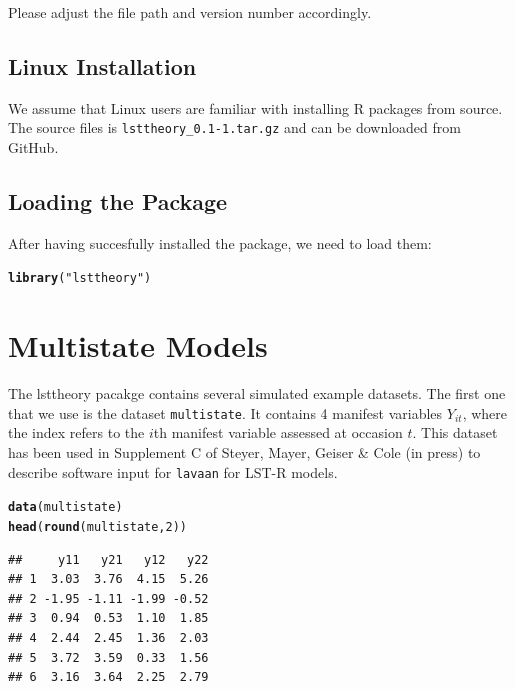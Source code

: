 \documentclass[10pt]{article}\usepackage{graphicx, color}
\makeatletter
\newcommand{\hlfunctioncall}[1]{\textcolor[rgb]{0.501960784313725,0,0.329411764705882}{\textbf{#1}}}%
\newcommand{\hlstring}[1]{\textcolor[rgb]{0.6,0.6,1}{#1}}%
\newenvironment{kframe}{%
 \def\at@end@of@kframe{}%
 \ifinner\ifhmode%
  \def\at@end@of@kframe{\end{minipage}}%
  \begin{minipage}{\columnwidth}%
 \fi\fi%
 \def\FrameCommand##1{\hskip\@totalleftmargin \hskip-\fboxsep
 \colorbox{shadecolor}{##1}\hskip-\fboxsep
     \hskip-\linewidth \hskip-\@totalleftmargin \hskip\columnwidth}%
 \MakeFramed {\advance\hsize-\width
   \@totalleftmargin\z@ \linewidth\hsize
   \@setminipage}}%
 {\par\unskip\endMakeFramed%
 \at@end@of@kframe}
\newenvironment{knitrout}{}{} %
\makeatother
\begin{document}
%
Please adjust the file path and version number accordingly. 

\subsection{Linux Installation}

We assume that Linux users are familiar with installing \textsf{R} packages from source. The source files is \texttt{lsttheory\_0.1-1.tar.gz} and can be downloaded from GitHub. 

\subsection{Loading the Package}

After having succesfully installed the package, we need to load them:
%
\begin{knitrout}
\color{fgcolor}\begin{kframe}
\begin{alltt}
\hlfunctioncall{library}(\hlstring{"lsttheory"})
\end{alltt}


{\ttfamily\noindent\itshape\color{messagecolor}{\#\# Loading required package: lavaan}}

{\ttfamily\noindent\itshape\color{messagecolor}{\#\# This is lavaan 0.5-16}}

{\ttfamily\noindent\itshape\color{messagecolor}{\#\# lavaan is BETA software! Please report any bugs.}}\end{kframe}
\end{knitrout}

%

\newpage
\section{Multistate Models}

The lsttheory pacakge contains several simulated example datasets. The first one that we use is the dataset \texttt{multistate}. It contains 4 manifest variables $Y_{it}$, where the index refers to the $i$th manifest variable assessed at occasion $t$. This dataset has been used in Supplement C of Steyer, Mayer, Geiser \& Cole (in press) to describe software input for \texttt{lavaan} for LST-R models.
%
\begin{knitrout}
\color{fgcolor}\begin{kframe}
\begin{alltt}
\hlfunctioncall{data}(multistate)
\hlfunctioncall{head}(\hlfunctioncall{round}(multistate, 2))
\end{alltt}
\begin{verbatim}
##     y11   y21   y12   y22
## 1  3.03  3.76  4.15  5.26
## 2 -1.95 -1.11 -1.99 -0.52
## 3  0.94  0.53  1.10  1.85
## 4  2.44  2.45  1.36  2.03
## 5  3.72  3.59  0.33  1.56
## 6  3.16  3.64  2.25  2.79
\end{verbatim}
\end{kframe}
\end{knitrout}
\end{document}
